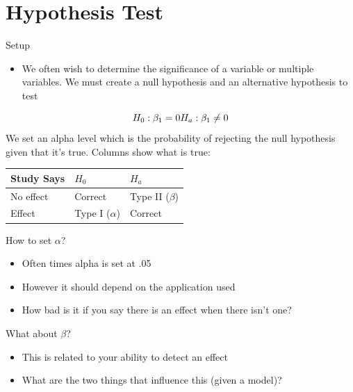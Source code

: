\documentclass[
  ignorenonframetext,
]{beamer}
\providecommand{\tightlist}{%
  \setlength{\itemsep}{0pt}\setlength{\parskip}{0pt}}
\begin{document}
\hypertarget{hypothesis-test}{%
\section{Hypothesis Test}\label{hypothesis-test}}

\begin{frame}{Setup}
\protect\hypertarget{setup}{}

\begin{itemize}
\tightlist
\item
  We often wish to determine the significance of a variable or multiple
  variables. We must create a null hypothesis and an alternative
  hypothesis to test
\end{itemize}

\[
H_0: \beta_1 = 0 \\
H_a: \beta_1 \neq 0
\] We set an alpha level which is the probability of rejecting the null
hypothesis given that it's true. Columns show what is true:

\begin{longtable}[]{@{}lll@{}}
\toprule
Study Says & \(H_0\) & \(H_a\)\tabularnewline
\midrule
\endhead
No effect & Correct & Type II (\(\beta\))\tabularnewline
Effect & Type I (\(\alpha\)) & Correct\tabularnewline
\bottomrule
\end{longtable}

\end{frame}

\begin{frame}{How to set \(\alpha\)?}
\protect\hypertarget{how-to-set-alpha}{}

\begin{itemize}
\tightlist
\item
  Often times alpha is set at .05
\item
  However it should depend on the application used
\item
  How bad is it if you say there is an effect when there isn't one?
\end{itemize}

\end{frame}

\begin{frame}{What about \(\beta\)?}
\protect\hypertarget{what-about-beta}{}

\begin{itemize}
\tightlist
\item
  This is related to your ability to detect an effect
\item
  What are the two things that influence this (given a model)?
\end{itemize}

\end{frame}
\end{document}
